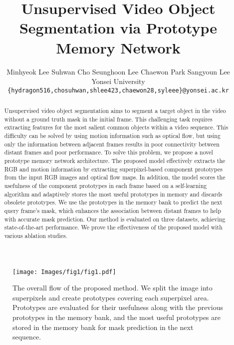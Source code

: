 \documentclass[10pt,twocolumn,letterpaper]{article}
\begin{document}
\title{Unsupervised Video Object Segmentation via Prototype Memory Network}

\author{
	Minhyeok Lee \quad
	Suhwan Cho \quad
	Seunghoon Lee \quad
	Chaewon Park \quad
	Sangyoun Lee \quad
\vspace{0.01cm}\\
	Yonsei University \\
	{\tt\small \{hydragon516,chosuhwan,shlee423,chaewon28,syleee\}@yonsei.ac.kr}
}

\maketitle
\thispagestyle{empty}

\begin{abstract}
	Unsupervised video object segmentation aims to segment a target object in the video without a ground truth mask in the initial frame. This challenging task requires extracting features for the most salient common objects within a video sequence. This difficulty can be solved by using motion information such as optical flow, but using only the information between adjacent frames results in poor connectivity between distant frames and poor performance. To solve this problem, we propose a novel prototype memory network architecture. The proposed model effectively extracts the RGB and motion information by extracting superpixel-based component prototypes from the input RGB images and optical flow maps. In addition, the model scores the usefulness of the component prototypes in each frame based on a self-learning algorithm and adaptively stores the most useful prototypes in memory and discards obsolete prototypes. We use the prototypes in the memory bank to predict the next query frame’s mask, which enhances the association between distant frames to help with accurate mask prediction. Our method is evaluated on three datasets, achieving state-of-the-art performance. We prove the effectiveness of the proposed model with various ablation studies.
\end{abstract}

\begin{figure}[t]
	\setlength{\belowcaptionskip}{-24pt}
	\begin{center}
		\texttt{[image: Images/fig1/fig1.pdf]}
		\caption{The overall flow of the proposed method. We split the image into superpixels and create prototypes covering each superpixel area. Prototypes are evaluated for their usefulness along with the previous prototypes in the memory bank, and the most useful prototypes are stored in the memory bank for mask prediction in the next sequence.}
		\label{fig:intro}
	\end{center}
\end{figure}
\end{document}
